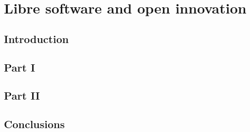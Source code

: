 \chapter{Libre software and open innovation}

\section{Introduction}

\section{Part I}\label{Part I}  %


\section{Part II}\label{Part II} %


 


\section{Conclusions}\label{conclusions}
